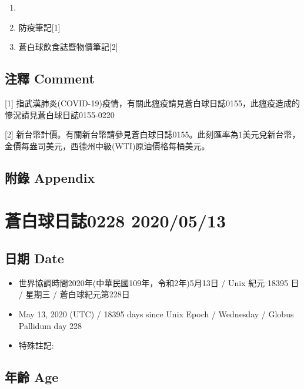 \documentclass[
]{article}
\providecommand{\tightlist}{%
  \setlength{\itemsep}{0pt}\setlength{\parskip}{0pt}}
\begin{document}
\begin{enumerate}
\def\labelenumi{\arabic{enumi}.}
\item
\item
  防疫筆記{[}1{]}
\item
  蒼白球飲食誌暨物價筆記{[}2{]}
\end{enumerate}

\hypertarget{ux6ce8ux91cb-comment-11}{%
\subsection{注釋 Comment}\label{ux6ce8ux91cb-comment-11}}

{[}1{]}
指武漢肺炎(COVID-19)疫情，有關此瘟疫請見蒼白球日誌0155，此瘟疫造成的慘況請見蒼白球日誌0155-0220

{[}2{]}
新台幣計價。有關新台幣請參見蒼白球日誌0155。此刻匯率為1美元兌新台幣，金價每盎司美元，西德州中級(WTI)原油價格每桶美元。

\hypertarget{ux9644ux9304-appendix-11}{%
\subsection{附錄 Appendix}\label{ux9644ux9304-appendix-11}}

\hypertarget{ux84bcux767dux7403ux65e5ux8a8c0228-20200513}{%
\section{蒼白球日誌0228
2020/05/13}\label{ux84bcux767dux7403ux65e5ux8a8c0228-20200513}}

\hypertarget{ux65e5ux671f-date-12}{%
\subsection{日期 Date}\label{ux65e5ux671f-date-12}}

\begin{itemize}
\tightlist
\item
  世界協調時間2020年(中華民國109年，令和2年)5月13日 / Unix 紀元 18395 日
  / 星期三 / 蒼白球紀元第228日
\item
  May 13, 2020 (UTC) / 18395 days since Unix Epoch / Wednesday / Globus
  Pallidum day 228
\item
  特殊註記:
\end{itemize}

\hypertarget{ux5e74ux9f61-age-12}{%
\subsection{年齡 Age}\label{ux5e74ux9f61-age-12}}
\end{document}
